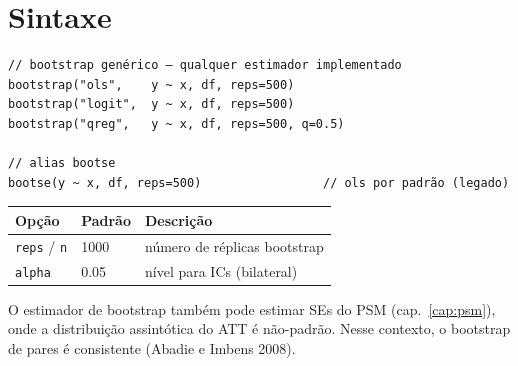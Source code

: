 \section{Sintaxe}

\begin{lstlisting}
// bootstrap genérico — qualquer estimador implementado
bootstrap("ols",    y ~ x, df, reps=500)
bootstrap("logit",  y ~ x, df, reps=500)
bootstrap("qreg",   y ~ x, df, reps=500, q=0.5)

// alias bootse
bootse(y ~ x, df, reps=500)                 // ols por padrão (legado)
\end{lstlisting}

\begin{center}
\begin{tabular}{lll}
\toprule
\textbf{Opção} & \textbf{Padrão} & \textbf{Descrição} \\
\midrule
\texttt{reps} / \texttt{n}  & 1000 & número de réplicas bootstrap \\
\texttt{alpha}               & 0.05 & nível para ICs (bilateral) \\
\bottomrule
\end{tabular}
\end{center}

\begin{nota}
  O estimador de bootstrap também pode estimar SEs do PSM (cap.~\ref{cap:psm}),
  onde a distribuição assintótica do ATT é não-padrão. Nesse contexto, o
  bootstrap de pares é consistente (Abadie e Imbens 2008).
\end{nota}

